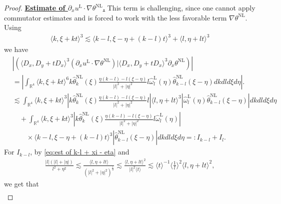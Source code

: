 \documentclass[reqno, 12pt]{amsart} %
\theoremstyle{plain} %
\theoremstyle{definition}
\theoremstyle{remark}
\numberwithin{equation}{section} %
\newcommand{\lt}{\left}
\newcommand{\rt}{\right}
\newcommand{\px}{\partial_x}
\begin{document}
\begin{proof}
		\underline{\bf Estimate of $\px u^{\mathrm{L}} \cdot \nabla \theta^{\mathrm{NL}}$.} This term is challenging, since one cannot apply commutator estimates and is forced to work with the less favorable term $\nabla \theta^{\mathrm{NL}}$.
		Using
		\begin{align*} \label{eq:temp1.0}
			\langle k, \xi+k t\rangle^3 \lesssim\langle k-l, \xi-\eta+(k-l) t\rangle^3  +  \langle l, \eta+l t\rangle^3
		\end{align*}
		we have
		\begin{equation}\begin{aligned} \label{eq:temp1}
				& \left|\left(\langle D_x, D_y+t D_x\rangle^3( \px u^{\mathrm{L}} \cdot \nabla \theta^{\mathrm{NL}}) \big| \langle D_x, D_y+t D_x\rangle^3 \px \theta^{\mathrm{NL}}\right)\right| \\
				&=  \left|\int_{\mathbb{R}^4}\langle k, \xi+k t\rangle^6 k \hat{\theta}_k^{\mathrm{NL}}(\xi) \frac{\eta(k-l)-l(\xi-\eta)}{|l|^2+|\eta|^2} l\hat{\omega}_l^{\mathrm{L}}(\eta) \hat{\theta}_{k-l}^{\mathrm{NL}}(\xi-\eta) d k d l d \xi d \eta\right|. \\
				&\lesssim  \int_{\mathbb{R}^4}\langle k, \xi+k t\rangle^3 \lt|k \hat{\theta}_k^{\mathrm{NL}}(\xi)  \frac{\eta(k-l)-l(\xi-\eta)}{|l|^2+|\eta|^2} l \rt| \langle l, \eta+l t\rangle^3 \lt| \hat{\omega}_l^{\mathrm{L}}(\eta)   \hat{\theta}_{k-l}^{\mathrm{NL}}(\xi-\eta) \rt| d k d l d \xi d \eta \\
				&\quad + \int_{\mathbb{R}^4}\langle k, \xi+k t\rangle^3 \lt| k \hat{\theta}_k^{\mathrm{NL}}(\xi) \frac{\eta(k-l)-l(\xi-\eta)}{|l|^2+|\eta|^2} l\hat{\omega}_l^{\mathrm{L}}(\eta) \rt| \\
				& \qquad \times  \langle k-l, \xi-\eta+(k-l) t\rangle^3 \lt| \hat{\theta}_{k-l}^{\mathrm{NL}}(\xi-\eta) \rt|  d k d l d \xi d \eta
				=:     I_{k-l} +I_{l}.
		\end{aligned}\end{equation}
		For $I_{k-l}$, by \eqref{eq:est of k-l + xi - eta} and
		\begin{equation}\begin{aligned} \label{eq:temp1.5}
				\frac{|l|(|l| + |\eta|)}{l^2   +  \eta^2}  \lesssim \frac{\langle l, \eta+l t\rangle}{(|l|^2+|\eta|^2)^\frac12} \lesssim \frac{\langle l, \eta+l t\rangle^2}{|l|^2\langle t\rangle} \lesssim\langle t\rangle^{-1}\langle\frac{1}{l}\rangle^2\langle l, \eta+l t\rangle^2,
		\end{aligned}\end{equation}
		we get that
		\begin{equation}\begin{aligned} \label{eq:temp2}

\end{aligned}
\end{equation}
\end{proof}
\end{document}

